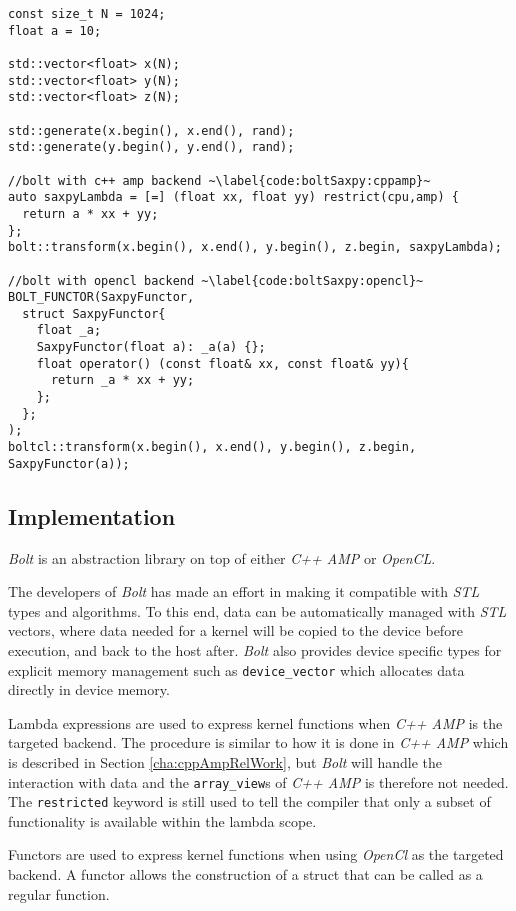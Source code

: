 \begin{lstlisting}[caption={Bolt \textit{SAXPY} example}, label={code:boltSaxpy}]
const size_t N = 1024;
float a = 10;

std::vector<float> x(N);
std::vector<float> y(N);
std::vector<float> z(N);

std::generate(x.begin(), x.end(), rand);
std::generate(y.begin(), y.end(), rand);

//bolt with c++ amp backend ~\label{code:boltSaxpy:cppamp}~
auto saxpyLambda = [=] (float xx, float yy) restrict(cpu,amp) {
  return a * xx + yy;
};
bolt::transform(x.begin(), x.end(), y.begin(), z.begin, saxpyLambda);

//bolt with opencl backend ~\label{code:boltSaxpy:opencl}~
BOLT_FUNCTOR(SaxpyFunctor,
  struct SaxpyFunctor{
    float _a;
    SaxpyFunctor(float a): _a(a) {};
    float operator() (const float& xx, const float& yy){
      return _a * xx + yy;
    };
  };
);
boltcl::transform(x.begin(), x.end(), y.begin(), z.begin, SaxpyFunctor(a));
\end{lstlisting}

\subsection{Implementation}
\textit{Bolt} is an abstraction library on top of either \textit{C++ AMP} or \textit{OpenCL}.  

The developers of \textit{Bolt} has made an effort in making it compatible with \textit{STL} types and algorithms. To this end, data can be automatically managed with \textit{STL} vectors, where data needed for a kernel will be copied to the device before execution, and back to the host after. \textit{Bolt} also provides device specific types for explicit memory management such as \texttt{device\_vector} which allocates data directly in device memory.

Lambda expressions are used to express kernel functions when \textit{C++ AMP} is the targeted backend. The procedure is similar to how it is done in \textit{C++ AMP} which is described in Section \ref{cha:cppAmpRelWork}, but \textit{Bolt} will handle the interaction with data and the \texttt{array\_view}s of \textit{C++ AMP} is therefore not needed. The \texttt{restricted} keyword is still used to tell the compiler that only a subset of functionality is available within the lambda scope.

Functors are used to express kernel functions when using \textit{OpenCl} as the targeted backend. A functor allows the construction of a struct that can be called as a regular function. 

